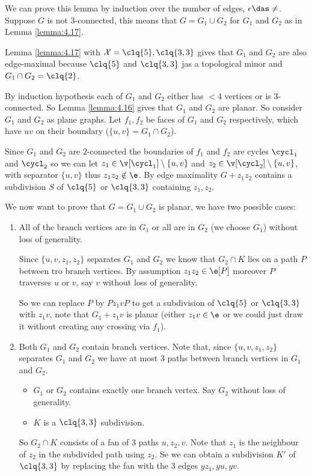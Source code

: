 \begin{prf}
    We can prove this lemma by induction over the number of edges, $e \das \ne$. Suppose $G$ is not $3$-connected, this means that $G = G_1 \cup G_2$ for $G_1$ and $G_2$ as in Lemma \ref{lemma:4.17}.

    Lemma \ref{lemma:4.17} with $\mathcal{X} = {\clq{5}, \clq{3, 3}}$ gives that $G_1$ and $G_2$ are also edge-maximal because $\clq{5}$ and $\clq{3, 3}$ jas a topological minor and $G_1 \cap G_2 = \clq{2}$.

    By induction hypothesis each of $G_1$ and $G_2$ either has $< 4$ vertices or is $3$-connected. So Lemma \ref{lemma:4.16} gives that $G_1$ and $G_2$ are planar. So consider $G_1$ and $G_2$ as plane graphs. Let $f_1, f_2$ be faces of $G_1$ and $G_2$ respectively, which have $uv$ on their boundary ($\{u, v\} = G_1 \cap G_2$).

    Since $G_1$ and $G_2$ are $2$-connected the boundaries of $f_1$ and $f_2$ are cycles $\cycl_1$ and $\cycl_2$ so we can let $z_1 \in \v[\cycl_1] \setminus \{u, v\}$ and $z_2 \in \v[\cycl_2] \setminus \{u, v\}$, with separator $\{u, v\}$ thus $z_1z_2 \notin \e$. By edge maximality $G + z_1z_2$ contains a subdivision $S$ of $\clq{5}$ or $\clq{3, 3}$ containing $z_1, z_2$.
    
    
    We now want to prove that $G = G_1 \cup G_2$ is planar, we have two possible cases:
    \begin{enumerate}
        \item All of the branch vertices are in $G_1$ or all are in $G_2$ (we choose $G_1$) without loss of generality.

        Since $\{u, v, z_1, z_2\}$ separates $G_1$ and $G_2$ we know that $G_2 \cap K$ lies on a path $P$ between tro branch vertices. By assumption $z_1z_2 \in \e[P]$ moreover $P$ traverses $u$ or $v$, say $v$ without loss of generality.

        So we can replace $P$ by $Pz_1vP$ to get a subdivision of $\clq{5}$ or $\clq{3, 3}$ with $z_1v$, note that $G_1 + z_1v$ is planar (either $z_1v \in \e$ or we could just draw it without creating any crossing via $f_1$).
        \item Both $G_1$ and $G_2$ contain branch vertices. Note that, since $\{u, v, z_1, z_2\}$ separates $G_1$ and $G_2$ we have at most $3$ paths between branch vertices in $G_1$ and $G_2$.
        \begin{itemize}
            \item $G_1$ or $G_2$ contains exactly one branch vertex. Say $G_2$ without loss of generality.
            \item $K$ is a $\clq{3, 3}$ subdivision.
        \end{itemize}
        So $G_2 \cap K$ consists of a fan of $3$ paths $u, z_2, v$. Note that $z_1$ is the neighbour of $z_2$ in the subdivided path using $z_2$. Se we can obtain a subdivision $K'$ of $\clq{3, 3}$ by replacing the fan with the $3$ edges $yz_1, yu, yv$.


\end{enumerate}
\end{prf}

